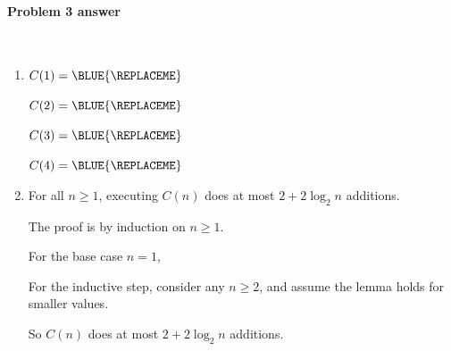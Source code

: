 

\paragraph{Problem 3 answer}~

\begin{enumerate}[label=(\alph*)]


\item                           %

  \(C(1) = \BLUE{
    \REPLACEME 
  }\) 

  \(C(2) = \BLUE{
    \REPLACEME 
  }\)

  \(C(3) = \BLUE{
    \REPLACEME 
  }\)

  \(C(4) = \BLUE{
    \REPLACEME 
  }\) 


\item                           %

  \begin{lemma}
    For all $n\ge 1$, executing $C(n)$ does at most $2+2\log_2 n$ additions.
  \end{lemma}

  \begin{longFormProof}

    \step The proof is by induction on $n\ge 1$.

    \step\label{step: base additions}
    For the base case $n=1$, \BLUE{
      \REPLACEME 
    }

    \begin{block}\label{block: mysterious additions}

      \step For the inductive step, consider any $n\ge 2$, and assume the lemma holds for smaller values.

      \begin{blue}

        \step \REPLACEME  
 
        \step \REPLACEME


      \end{blue}
      
      \step So $C(n)$ does at most $2 + 2\log_2 n$ additions.
    \end{block}


\end{longFormProof}
\end{enumerate}
